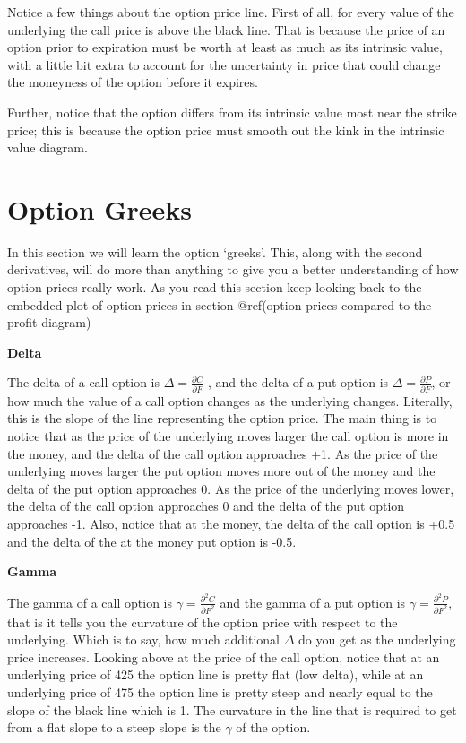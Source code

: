 \documentclass[
  letterpaper,
  DIV=11,
  numbers=noendperiod]{scrreprt}
\begin{document}
Notice a few things about the option price line. First of all, for every
value of the underlying the call price is above the black line. That is
because the price of an option prior to expiration must be worth at
least as much as its intrinsic value, with a little bit extra to account
for the uncertainty in price that could change the moneyness of the
option before it expires.

Further, notice that the option differs from its intrinsic value most
near the strike price; this is because the option price must smooth out
the kink in the intrinsic value diagram.

\hypertarget{option-greeks}{%
\section{Option Greeks}\label{option-greeks}}

In this section we will learn the option `greeks'. This, along with the
second derivatives, will do more than anything to give you a better
understanding of how option prices really work. As you read this section
keep looking back to the embedded plot of option prices in section
@ref(option-prices-compared-to-the-profit-diagram)

\textbf{Delta}

The delta of a call option is \(\Delta = \frac{\partial C}{\partial F}\)
, and the delta of a put option is
\(\Delta = \frac{\partial P}{\partial F}\), or how much the value of a
call option changes as the underlying changes. Literally, this is the
slope of the line representing the option price. The main thing is to
notice that as the price of the underlying moves larger the call option
is more in the money, and the delta of the call option approaches +1. As
the price of the underlying moves larger the put option moves more out
of the money and the delta of the put option approaches 0. As the price
of the underlying moves lower, the delta of the call option approaches 0
and the delta of the put option approaches -1. Also, notice that at the
money, the delta of the call option is +0.5 and the delta of the at the
money put option is -0.5.

\textbf{Gamma}

The gamma of a call option is
\(\gamma = \frac{\partial^2 C}{\partial F^2}\) and the gamma of a put
option is \(\gamma = \frac{\partial^2 P}{\partial F^2}\), that is it
tells you the curvature of the option price with respect to the
underlying. Which is to say, how much additional \(\Delta\) do you get
as the underlying price increases. Looking above at the price of the
call option, notice that at an underlying price of 425 the option line
is pretty flat (low delta), while at an underlying price of 475 the
option line is pretty steep and nearly equal to the slope of the black
line which is 1. The curvature in the line that is required to get from
a flat slope to a steep slope is the \(\gamma\) of the option.
\end{document}
